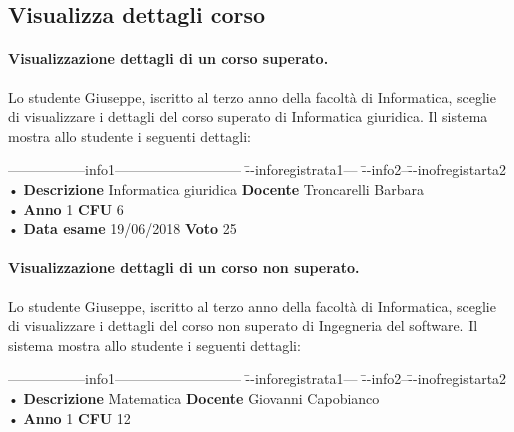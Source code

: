 \subsection{Visualizza dettagli corso}
\paragraph{Visualizzazione dettagli di un corso superato.}
Lo studente Giuseppe, iscritto al terzo anno della facoltà di Informatica, sceglie di visualizzare i dettagli del corso superato di Informatica giuridica. Il sistema mostra allo studente i seguenti dettagli:

 \begin{tabbing}
	\hspace{1cm}-----------------info1--------------------------- \= --inforegistrata1--- \= --info2--\=--inofregistarta2 \kill
	\hspace{1cm} • \textbf{Descrizione} Informatica giuridica \> \textbf{Docente} Troncarelli Barbara\\
	\hspace{1cm} • \textbf{Anno} 1 \> \textbf{CFU} 6   \\
	\hspace{1cm} • \textbf{Data esame} 19/06/2018 \> \textbf{Voto} 25 \\
\end{tabbing}

\paragraph{Visualizzazione dettagli di un corso non superato.}
Lo studente Giuseppe, iscritto al terzo anno della facoltà di Informatica, sceglie di visualizzare i dettagli del corso non superato di Ingegneria del software. Il sistema mostra allo studente i seguenti dettagli:

 \begin{tabbing}
	\hspace{1cm}-----------------info1--------------------------- \= --inforegistrata1--- \= --info2--\=--inofregistarta2 \kill
	\hspace{1cm} • \textbf{Descrizione} Matematica \> \textbf{Docente} Giovanni  Capobianco\\
	\hspace{1cm} • \textbf{Anno} 1 \> \textbf{CFU} 12  \\
\end{tabbing}


